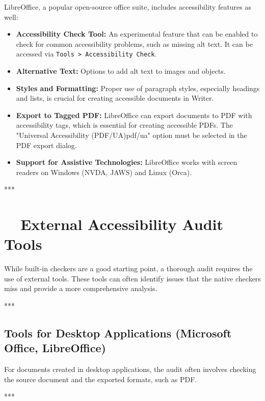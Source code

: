 LibreOffice, a popular open-source office suite, includes accessibility features as well\supercite{LibreOfficeAccessibility}:
\begin{itemize}
	\item \textbf{Accessibility Check Tool:} An experimental feature that can be enabled to check for common accessibility problems, such as missing alt text. It can be accessed via \texttt{Tools > Accessibility Check}.
	\item \textbf{Alternative Text:} Options to add alt text to images and objects.
	\item \textbf{Styles and Formatting:} Proper use of paragraph styles, especially headings and lists, is crucial for creating accessible documents in Writer.
	\item \textbf{Export to Tagged PDF:} LibreOffice can export documents to PDF with accessibility tags, which is essential for creating accessible PDFs. The "Universal Accessibility (PDF/UA)\gls{pdf/ua}" option must be selected in the PDF export dialog.
	\item \textbf{Support for Assistive Technologies:} LibreOffice works with screen readers on Windows (NVDA, JAWS) and Linux (Orca).
\end{itemize}

***

\section{~~External Accessibility Audit Tools}
\label{sec:external-accessibility-audit-tools}

While built-in checkers are a good starting point, a thorough audit requires the use of external tools. These tools can often identify issues that the native checkers miss and provide a more comprehensive analysis.

***

\subsection{Tools for Desktop Applications (Microsoft Office, LibreOffice)}
\label{sub:tools-for-desktop-applications-microsoft-office-libreoffice}

For documents created in desktop applications, the audit often involves checking the source document and the exported formats, such as PDF.

***

